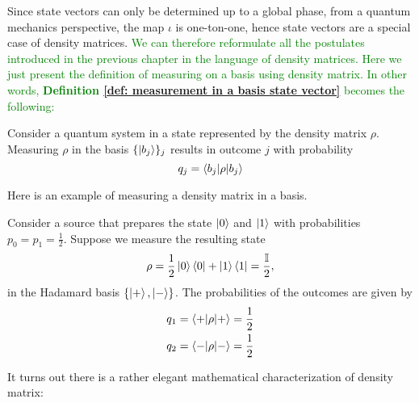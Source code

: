Since state vectors can only be determined up to a global phase, from a quantum mechanics perspective, the map $\iota$ is one-ton-one, hence state vectors are a special case of density matrices. \textcolor{green}{We can therefore reformulate all the postulates introduced in the previous chapter in the language of density matrices. Here we just present the definition of measuring on a basis using density matrix. In other words, \textbf{Definition \ref{def: measurement in a basis state vector}} becomes the following:}


\begin{definition}
Consider a quantum system in a state represented by the density matrix $\rho$. Measuring $\rho$ in the basis $\{\ket{b_j}\}_j$ results in outcome $j$ with probability 
\begin{equation} \label{eqn: measurement probability in density matrix}
    q_j=\braket{b_j | \rho |b_j}
\end{equation}
\end{definition}

 Here is an example of measuring a density matrix in a basis.


{\color{green}
\begin{example}
Consider a source that prepares the state $\ket{0}$ and $\ket{1}$ with probabilities $p_0=p_1=\frac{1}{2}$. Suppose we measure the resulting state
$$\rho=\frac{1}{2}\ket{0}\bra{0}+\ket{1}\bra{1}=\frac{\mathbb{I}}{2},$$
in the Hadamard basis $\{\ket{+}, \ket{-}\}$. The probabilities of the outcomes are given by 
\begin{gather}
    q_1=\braket{+|\rho|+}=\frac{1}{2}\\
    q_2=\braket{-|\rho|-}=\frac{1}{2}
\end{gather}
\end{example}
}

It turns out there is a rather elegant mathematical characterization of density matrix:


